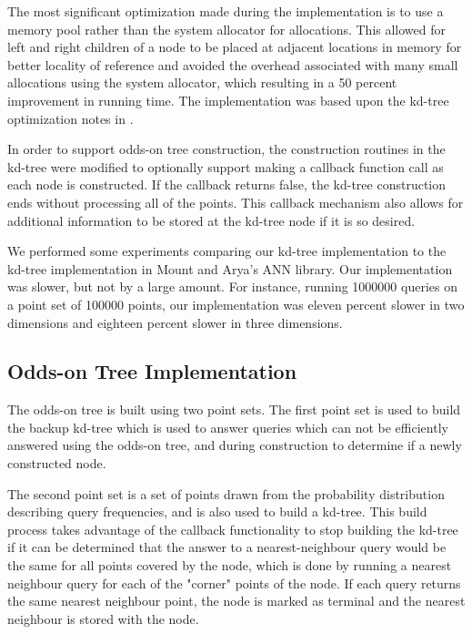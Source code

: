 \documentclass[mcs]{scsthesis}
\begin{document}
The most significant optimization made during the implementation is to use
a memory pool rather than the system allocator for allocations. This allowed
for left and right children of a node to be placed at adjacent locations in
memory for better locality of reference and avoided the overhead associated
with many small allocations using the system allocator, which resulting in a
50 percent improvement in running time. The implementation was based upon the
kd-tree optimization notes in \cite{physicallybasedrendering}.

In order to support odds-on tree construction, the construction routines in
the kd-tree were modified to optionally support making a callback function
call as each node is constructed. If the callback returns false, the kd-tree
construction ends without processing all of the points. This callback
mechanism also allows for additional information to be stored at the kd-tree
node if it is so desired.

We performed some experiments comparing our kd-tree implementation to the 
kd-tree implementation in Mount and Arya's ANN library\cite{ann}. Our
implementation was slower, but not by a large amount. For instance, running
1000000 queries on a point set of 100000 points, our implementation was eleven
percent slower in two dimensions and eighteen percent slower in three
dimensions.

\subsection{Odds-on Tree Implementation}

The odds-on tree is built using two point sets. The first point set is used
to build the backup kd-tree which is used to answer queries which can not be
efficiently answered using the odds-on tree, and during construction to
determine if a newly constructed node.

The second point set is a set of points drawn from the probability distribution
describing query frequencies, and is also used to build a kd-tree. This build
process takes advantage of the callback functionality to stop building the
kd-tree if it can be determined that the answer to a nearest-neighbour query
would be the same for all points covered by the node, which is done by
running a nearest neighbour query for each of the "corner" points of the node.
If each query returns the same nearest neighbour point, the node is marked
as terminal and the nearest neighbour is stored with the node.
\end{document}
